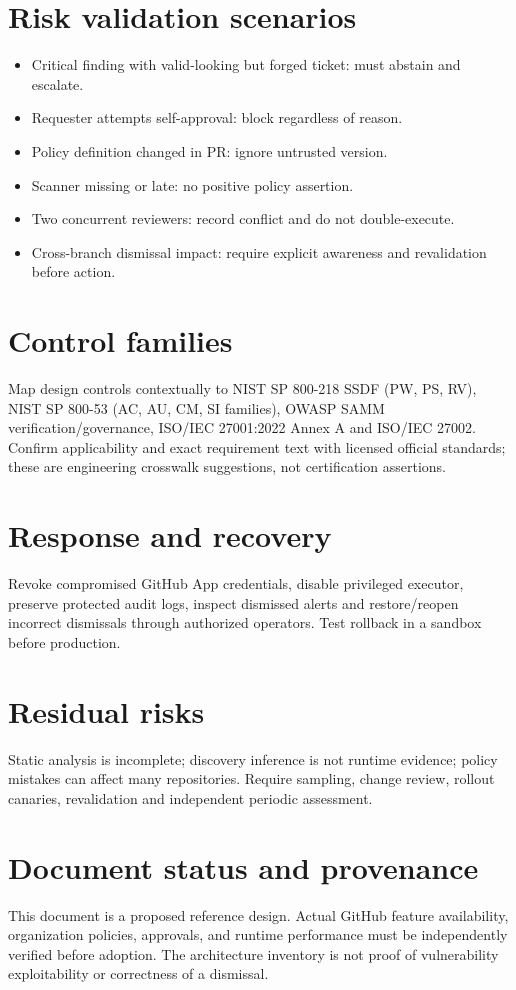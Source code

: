\documentclass[11pt,letterpaper]{article}
\begin{document}
\section{Risk validation scenarios}
\begin{itemize}
\item Critical finding with valid-looking but forged ticket: must abstain and escalate.
\item Requester attempts self-approval: block regardless of reason.
\item Policy definition changed in PR: ignore untrusted version.
\item Scanner missing or late: no positive policy assertion.
\item Two concurrent reviewers: record conflict and do not double-execute.
\item Cross-branch dismissal impact: require explicit awareness and revalidation before action.
\end{itemize}

\section{Control families}
Map design controls contextually to NIST SP 800-218 SSDF (PW, PS, RV), NIST SP 800-53 (AC, AU, CM, SI families), OWASP SAMM verification/governance, ISO/IEC 27001:2022 Annex A and ISO/IEC 27002. Confirm applicability and exact requirement text with licensed official standards; these are engineering crosswalk suggestions, not certification assertions.


\section{Response and recovery}
Revoke compromised GitHub App credentials, disable privileged executor, preserve protected audit logs, inspect dismissed alerts and restore/reopen incorrect dismissals through authorized operators. Test rollback in a sandbox before production.


\section{Residual risks}
Static analysis is incomplete; discovery inference is not runtime evidence; policy mistakes can affect many repositories. Require sampling, change review, rollout canaries, revalidation and independent periodic assessment.


\section*{Document status and provenance}
This document is a proposed reference design. Actual GitHub feature availability, organization policies, approvals, and runtime performance must be independently verified before adoption. The architecture inventory is not proof of vulnerability exploitability or correctness of a dismissal.
\end{document}

